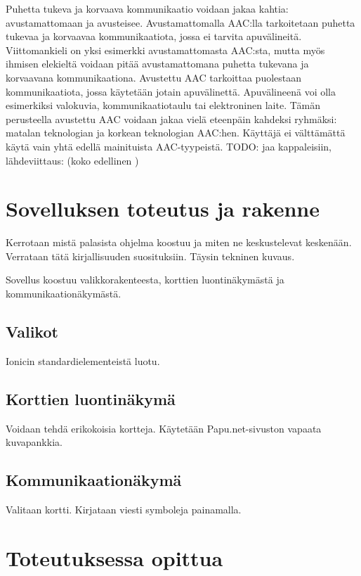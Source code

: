 \documentclass[utf8]{gradu3}
\begin{document}
Puhetta tukeva ja korvaava kommunikaatio voidaan jakaa kahtia: avustamattomaan ja avusteisee. Avustamattomalla AAC:lla tarkoitetaan puhetta tukevaa ja korvaavaa kommunikaatiota, jossa ei tarvita apuvälineitä. Viittomankieli on yksi esimerkki avustamattomasta AAC:sta, mutta myös ihmisen elekieltä voidaan pitää avustamattomana puhetta tukevana ja korvaavana kommunikaationa. Avustettu AAC tarkoittaa puolestaan kommunikaatiota, jossa käytetään jotain apuvälinettä. Apuvälineenä voi olla esimerkiksi valokuvia, kommunikaatiotaulu tai elektroninen laite. Tämän perusteella avustettu AAC voidaan jakaa vielä eteenpäin kahdeksi ryhmäksi: matalan teknologian ja korkean teknologian AAC:hen. Käyttäjä ei välttämättä käytä vain yhtä edellä mainituista AAC-tyypeistä.  TODO: jaa kappaleisiin, lähdeviittaus: (koko edellinen \parencite[]{AAC-conditional-use})

\chapter{Sovelluksen toteutus ja rakenne}

Kerrotaan mistä palasista ohjelma koostuu ja miten ne keskustelevat keskenään. Verrataan tätä kirjallisuuden suosituksiin.
Täysin tekninen kuvaus.

Sovellus koostuu valikkorakenteesta, korttien luontinäkymästä ja kommunikaationäkymästä.

\section{Valikot}

Ionicin standardielementeistä luotu.

\section{Korttien luontinäkymä}

Voidaan tehdä erikokoisia kortteja. Käytetään Papu.net-sivuston vapaata kuvapankkia.

\section{Kommunikaationäkymä}

Valitaan kortti. Kirjataan viesti symboleja painamalla.

\chapter{Toteutuksessa opittua}
\end{document}
